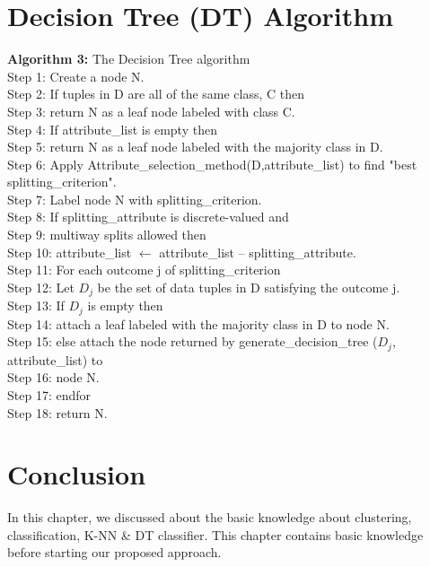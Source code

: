 \documentclass[document.tex]{subfiles}
\begin{document}
\section{Decision Tree (DT) Algorithm}
\begin{algorithm}[H]
	\textbf{Algorithm 3: }
	The Decision Tree algorithm\cite{a38}	\\
	Step 1: Create a node N.\\
	Step 2: If tuples in D are all of the same class, C then \\
	Step 3: return N as a leaf node labeled with class C.\\
	Step 4: If attribute\_list is empty then \\
	Step 5: return N as a leaf node labeled with the majority class in D.\\
	Step 6: Apply Attribute\_selection\_method(D,attribute\_list) to find "best splitting\_criterion".\\
	Step 7: Label node N with splitting\_criterion.\\
	Step 8: If splitting\_attribute is discrete-valued and \\
	Step 9: multiway splits allowed then\\
	Step 10: attribute\_list $\leftarrow$ attribute\_list – splitting\_attribute.\\
	Step 11: For each outcome j of splitting\_criterion\\
	Step 12: Let $D_j$ be the set of data tuples in D satisfying the outcome j.\\
	Step 13: If $D_j$ is empty then\\
	Step 14: attach a leaf labeled with the majority class in D to node N.\\
	Step 15: else attach the node returned by generate\_decision\_tree ($D_j$, attribute\_list) to \\
	Step 16: node N.\\
	Step 17: endfor\\
	Step 18: return N.\\ 

\end{algorithm}
\section{Conclusion}
In this chapter, we discussed about the basic knowledge about clustering, classification, K-NN \& DT classifier. This chapter contains basic knowledge before starting our proposed approach.
\end{document}

